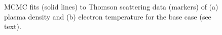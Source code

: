 \documentclass[%
 aip,
 amsmath,amssymb,
 reprint,%
]{revtex4-1}
\begin{document}
\begin{figure}[!htbp]
\begin{subfigure}[]{0.45\textwidth}
\end{subfigure}
\hfill
\begin{subfigure}[]{0.45\textwidth}
\end{subfigure}

\caption{MCMC fits (solid lines) to Thomson scattering data (markers) of (a) plasma density and (b) electron temperature for the base case (see text).}
\label{fig:nT_base_case}
\end{figure}
\end{document}
